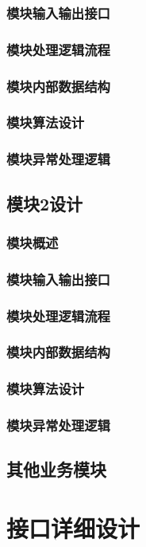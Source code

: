\documentclass{../template/softeng}
\begin{document}
\subsubsection{模块输入输出接口}
\subsubsection{模块处理逻辑流程}
\subsubsection{模块内部数据结构}
\subsubsection{模块算法设计}
\subsubsection{模块异常处理逻辑}

\subsection{模块2设计}
\subsubsection{模块概述}
\subsubsection{模块输入输出接口}
\subsubsection{模块处理逻辑流程}
\subsubsection{模块内部数据结构}
\subsubsection{模块算法设计}
\subsubsection{模块异常处理逻辑}

\subsection{其他业务模块}

\section{接口详细设计}
\end{document}
